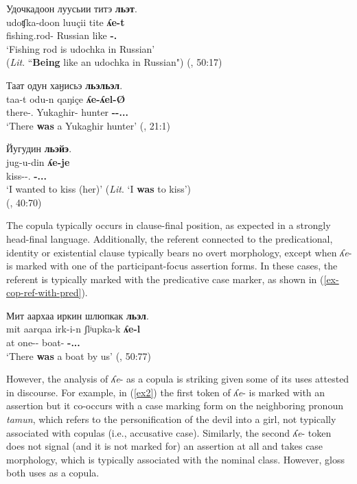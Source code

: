 \documentclass[output=paper,colorlinks,citecolor=brown
\ChapterDOI{10.5281/zenodo.15697581}
]{langscibook}
\begin{document}
\ea \label{ex-cop-identity}
    \glll Удочкадоон луусьии титэ \textbf{льэт}. \\
    udoʧka-doon luuçii tite \textbf{ʎe-t}  \\
    fishing.rod-\Nmlz{} Russian like \textbf{\Cop-\Cvb.\Ctx{}} \\
    \glt `Fishing rod is udochka in Russian' \\
    (\textit{Lit}. ``\textbf{Being} like an udochka in Russian") \hfill (\citealt{Nikolaeva_Mayer2004}, 50:17)
\z

\ea \label{ex-cop-existential}
    \glll Таат одун хаӈисьэ \textbf{льэльэл}. \\
    taa-t odu-n qaŋiçe \textbf{ʎe-ʎel-Ø}  \\
    there-\Adv.\Abl{} Yukaghir-\Lnk{} hunter \textbf{\Cop-\Ev-\Ass.\Intr.\Ef.\Tsg{}} \\
    \glt `There \textbf{was} a Yukaghir hunter' \hfill (\citealt{Nikolaeva_Mayer2004}, 21:1)
\z

\ea \label{ex-cop-aux}
    \glll Йугудин \textbf{льэйэ}. \\
    jug-u-din \textbf{ʎe-je}  \\
    kiss-\Ep-\Cvb.\Purp{} \textbf{\Cop-\Ass.\Intr.\Ef.\Fsg{}} \\
    \glt `I wanted to kiss (her)' (\textit{Lit}. `I \textbf{was} to kiss') \\
    \hfill (\citealt{Nikolaeva_Mayer2004}, 40:70)
\z

The copula typically occurs in clause-final position, as expected in a strongly head-final language.  
Additionally, the referent connected to the predicational, identity or existential clause typically bears no overt morphology, except when \textit{ʎe}- is marked with one of the participant-focus assertion forms. 
In these cases, the referent is typically marked with the predicative case marker, as shown in (\ref{ex-cop-ref-with-pred}). 

\ea \label{ex-cop-ref-with-pred}
    \glll Мит аархаа иркин шлюпкак \textbf{льэл}. \\
    mit aarqaa irk-i-n ʃlʲupka-k \textbf{ʎe-l}  \\
    \Fpl{} at one-\Ep-\Lnk{} boat-\Pred{} \textbf{\Cop-\Ass.\Intr.\Pf.\Tsg{}} \\
    \glt `There \textbf{was} a boat by us' \hfill (\citealt{Nikolaeva_Mayer2004}, 50:77)
\z

However, the analysis of \textit{ʎe}- as a copula is striking given some of its uses attested in discourse.
For example, in (\ref{ex2}) the first token of \textit{ʎe}- is marked with an assertion but it co-occurs with a case marking form on the neighboring pronoun \textit{tamun}, which refers to the personification of the devil into a girl, not typically associated with copulas (i.e., accusative case). 
Similarly, the second \textit{ʎe}- token does not signal (and it is not marked for) an assertion at all and takes case morphology, which is typically associated with the nominal class. 
However, \citet{Nikolaeva_Mayer2004} gloss both uses as a copula. 
\end{document}
